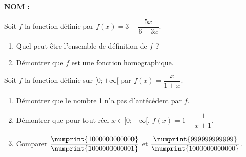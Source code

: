\documentclass[a4paper,11pt,DIV15,BCOR0mm]{scrartcl}
\begin{document}
\newcommand{\vv}[1]{\vect{#1}}
\noindent\textbf{NOM : }

\begin{exercice}
Soit $f$ la fonction \og définie\fg{} par $f(x)=3+\dfrac{5x}{6-3x}$.
\begin{enumerate}
  \item Quel peut-être l'ensemble de définition de $f$ ?
  \vfill
  \item Démontrer que $f$ est une fonction homographique.
  \vfill
\end{enumerate}
\end{exercice}

\begin{exercice}
Soit $f$ la fonction définie sur $[0;+\infty[$
par $f(x)=\dfrac{x}{1+x}$.
\begin{enumerate}
\item Démontrer que le nombre 1 n'a pas d'antécédent par $f$.
\vfill
\item Démontrer que pour tout réel $x\in [0;+\infty[$,
$f(x)=1-\dfrac{1}{x+1}$.
\vfill
\item Comparer $\dfrac{\numprint{1000000000000}}{\numprint{1000000000001}}$ et 
$\dfrac{\numprint{999999999999}}{\numprint{1000000000000}}$.
\vfill


\end{enumerate}
\end{exercice}
\end{document}
